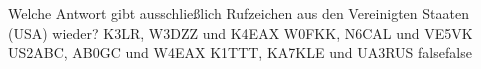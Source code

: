     {Welche Antwort gibt ausschließlich Rufzeichen aus den Vereinigten Staaten (USA) wieder?}
    {K3LR, W3DZZ und K4EAX}
    {W0FKK, N6CAL und VE5VK}
    {US2ABC, AB0GC und W4EAX}
    {K1TTT, KA7KLE und UA3RUS}
    {false}{false}